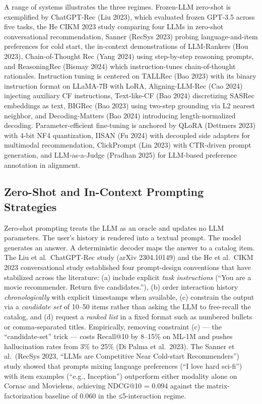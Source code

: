 A range of systems illustrates the three regimes. Frozen-LLM zero-shot is exemplified by ChatGPT-Rec (Liu 2023), which evaluated frozen GPT-3.5 across five tasks, the He CIKM 2023 study comparing four LLMs in zero-shot conversational recommendation, Sanner (RecSys 2023) probing language-and-item preferences for cold start, the in-context demonstrations of LLM-Rankers (Hou 2023), Chain-of-Thought Rec (Yang 2024) using step-by-step reasoning prompts, and ReasoningRec (Bismay 2024) which instruction-tunes chain-of-thought rationales. Instruction tuning is centered on TALLRec (Bao 2023) with its binary instruction format on LLaMA-7B with LoRA, Aligning-LLM-Rec (Cao 2024) injecting auxiliary CF instructions, Text-like-CF (Bao 2024) discretizing SASRec embeddings as text, BIGRec (Bao 2023) using two-step grounding via L2 nearest neighbor, and Decoding-Matters (Bao 2024) introducing length-normalized decoding. Parameter-efficient fine-tuning is anchored by QLoRA (Dettmers 2023) with 4-bit NF4 quantization, IISAN (Fu 2024) with decoupled side adapters for multimodal recommendation, ClickPrompt (Lin 2023) with CTR-driven prompt generation, and LLM-as-a-Judge (Pradhan 2025) for LLM-based preference annotation in alignment.

\subsection{Zero-Shot and In-Context Prompting Strategies}\label{zero-shot-and-in-context-prompting-strategies}

Zero-shot prompting treats the LLM as an oracle and updates no LLM parameters. The user's history is rendered into a textual prompt. The model generates an answer. A deterministic decoder maps the answer to a catalog item. The Liu et al.~ChatGPT-Rec study (arXiv 2304.10149) and the He et al.~CIKM 2023 conversational study established four prompt-design conventions that have stabilized across the literature: (a) include explicit \emph{task instructions} (``You are a movie recommender. Return five candidates.''), (b) order interaction history \emph{chronologically} with explicit timestamps when available, (c) constrain the output via a \emph{candidate set} of 10--50 items rather than asking the LLM to free-recall the catalog, and (d) request a \emph{ranked list} in a fixed format such as numbered bullets or comma-separated titles. Empirically, removing constraint (c) --- the ``candidate-set'' trick --- costs Recall@10 by 8--15\% on ML-1M and pushes hallucination rates from 3\% to 25\% (Di Palma et al.~2023). The Sanner et al.~(RecSys 2023, ``LLMs are Competitive Near Cold-start Recommenders'') study showed that prompts mixing language preferences (``I love hard sci-fi'') with item examples (``e.g., Inception'') outperform either modality alone on Cornac and Movielens, achieving NDCG@10 = 0.094 against the matrix-factorization baseline of 0.060 in the ≤5-interaction regime.

